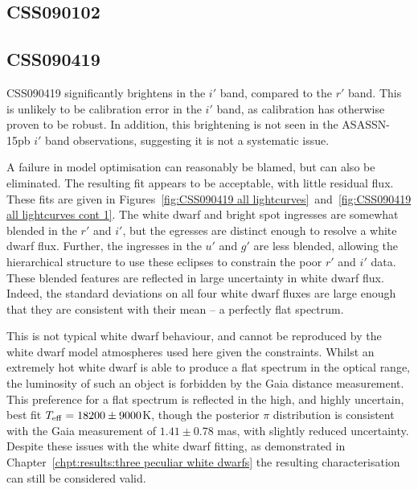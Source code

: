 
\subsection{CSS090102}

\subsection{CSS090419}

CSS090419 significantly brightens in the $i'$ band, compared to the $r'$ band. This is unlikely to be calibration error in the $i'$ band, as calibration has otherwise proven to be robust. In addition, this brightening is not seen in the ASASSN-15pb $i'$ band observations, suggesting it is not a systematic issue.

A failure in model optimisation can reasonably be blamed, but can also be eliminated. The resulting fit appears to be acceptable, with little residual flux. These fits are given in Figures~\ref{fig:CSS090419 all lightcurves}~and~\ref{fig:CSS090419 all lightcurves cont 1}.
The white dwarf and bright spot ingresses are somewhat blended in the $r'$ and $i'$, but the egresses are distinct enough to resolve a white dwarf flux. Further, the ingresses in the $u'$ and $g'$ are less blended, allowing the hierarchical structure to use these eclipses to constrain the poor $r'$ and $i'$ data.
These blended features are reflected in large uncertainty in white dwarf flux. Indeed, the standard deviations on all four white dwarf fluxes are large enough that they are consistent with their mean -- a perfectly flat spectrum.

This is not typical white dwarf behaviour, and cannot be reproduced by the white dwarf model atmospheres used here given the constraints. Whilst an extremely hot white dwarf is able to produce a flat spectrum in the optical range, the luminosity of such an object is forbidden by the Gaia distance measurement.
This preference for a flat spectrum is reflected in the high, and highly uncertain, best fit $T_{\rm eff} = 18200 \pm 9000$K, though the posterior $\pi$ distribution is consistent with the Gaia measurement of $1.41\pm0.78$ mas, with slightly reduced uncertainty.
Despite these issues with the white dwarf fitting, as demonstrated in Chapter~\ref{chpt:results:three peculiar white dwarfs} the resulting characterisation can still be considered valid.


